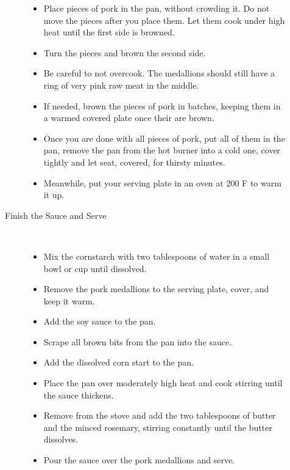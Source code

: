 \documentclass[11pt,letterpaper]{article}
\begin{document}
\begin{description}
\begin{description}
\begin{itemize}
			\item Place pieces of pork in the pan, without crowding it. Do not move the pieces after you place them. Let them cook under high heat until the first side is browned. 
			\item Turn the pieces and brown the second side.
			\item Be careful to not overcook. The medallions should still have a ring of very pink raw meat in the middle.
			\item If needed, brown the pieces of pork in batches, keeping them in a warmed covered plate once their are brown.
			\item Once you are done with all pieces of pork, put all of them in the pan, remove the pan from the hot burner into a cold one, cover tightly and let seat, covered, for thirsty minutes.
			\item Meanwhile, put your serving plate in an oven at 200 F to warm it up.
		\end{itemize}	
	\item [Finish the Sauce and Serve]\ \\
		\begin{itemize}
			\item Mix the cornstarch with two tablespoons of water in a small bowl or cup until dissolved.
			\item Remove the pork medallions to the serving plate, cover, and keep it warm.
			\item Add the soy sauce to the pan.
			\item Scrape all brown bits from the pan into the sauce.
			\item Add the dissolved corn start to the pan.
			\item Place the pan over moderately high heat and cook stirring until the sauce thickens.
			\item Remove from the stove and add the two tablespoons of butter and the minced rosemary, stirring constantly until the butter dissolves.
			\item Pour the sauce over the pork medallions and serve.
		\end{itemize}
	\end{description}
\end{description}
\end{document}
